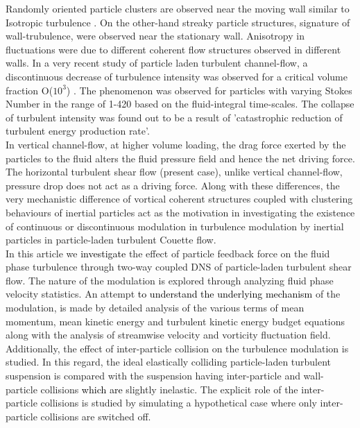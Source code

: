 \documentclass[aip,graphicx]{revtex4-1}
\begin{document}
   Randomly oriented particle clusters are observed near the moving wall similar to Isotropic turbulence . On the other-hand streaky particle structures, signature of wall-trubulence, were observed near the stationary wall. Anisotropy in fluctuations were due to different coherent flow structures observed in different walls.
   In a very recent study of particle laden turbulent channel-flow, a discontinuous decrease of turbulence intensity was observed for a critical volume fraction O($10^3$) \citep{muramulla2020disruption}. The phenomenon was observed for particles with varying Stokes Number in the range of 1-420 based on the fluid-integral time-scales. The collapse of turbulent intensity was found out to be a result of 'catastrophic reduction of turbulent energy production rate'.
   \\In vertical channel-flow, at higher volume loading, the drag force exerted by the particles to the fluid alters the fluid pressure field and hence the net driving force. The horizontal turbulent shear flow (present case), unlike vertical channel-flow, pressure drop does not act as a driving force. Along with these differences, the very mechanistic difference of vortical coherent structures coupled with clustering behaviours of inertial particles act as the motivation in investigating the existence of continuous or discontinuous modulation in turbulence modulation by inertial particles in particle-laden turbulent Couette flow.
  \\ In this article we \textcolor{black}{investigate} the effect of particle feedback force on the fluid phase turbulence through two-way coupled DNS of particle-laden turbulent shear flow. The nature of the modulation is explored through analyzing fluid phase velocity statistics. An attempt \textcolor{black}{to understand the underlying mechanism} of the modulation, is made by detailed analysis of the various terms of mean momentum, mean kinetic energy and turbulent kinetic energy budget equations along with the analysis of streamwise velocity and vorticity fluctuation field. Additionally, the effect of inter-particle collision on the turbulence modulation is studied. In this regard, the ideal elastically colliding particle-laden turbulent suspension is compared with the suspension having inter-particle and wall-particle collisions \textcolor{black}{which are} slightly inelastic. The explicit role of the inter-particle collisions is studied by simulating a hypothetical case where only inter-particle collisions are switched off.
  
\end{document}
